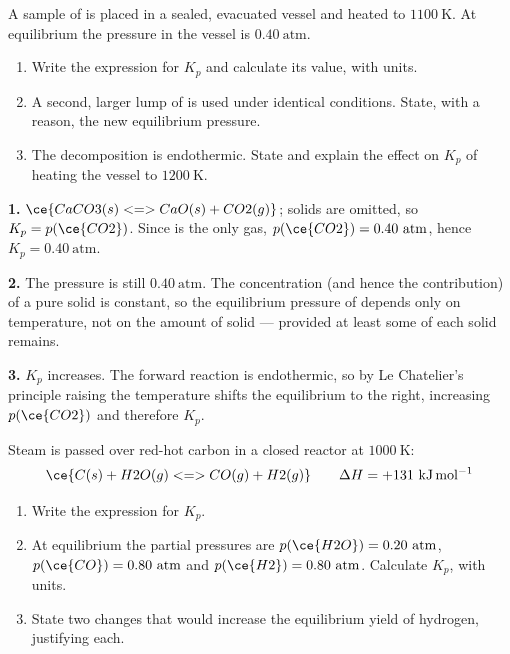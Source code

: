\documentclass[11pt]{article}
\begin{document}
\begin{exercice}
A sample of  is placed in a sealed, evacuated vessel and heated to $1100\ \mathrm{K}$. At equilibrium the pressure in the vessel is $0.40\ \mathrm{atm}$.
\begin{enumerate}
\item Write the expression for $K_p$ and calculate its value, with units.
\item A second, larger lump of  is used under identical conditions. State, with a reason, the new equilibrium pressure.
\item The decomposition is endothermic. State and explain the effect on $K_p$ of heating the vessel to $1200\ \mathrm{K}$.
\end{enumerate}
\end{exercice}

\begin{corrige}[Exercise 1]
\textbf{1.} $\ce{CaCO3(s) <=> CaO(s) + CO2(g)}$; solids are omitted, so $K_p = p(\ce{CO2})$. Since  is the only gas, $p(\ce{CO2}) = 0.40\ \mathrm{atm}$, hence $K_p = 0.40\ \mathrm{atm}$.

\textbf{2.} The pressure is still $0.40\ \mathrm{atm}$. The concentration (and hence the contribution) of a pure solid is constant, so the equilibrium pressure of  depends only on temperature, not on the amount of solid — provided at least some of each solid remains.

\textbf{3.} $K_p$ increases. The forward reaction is endothermic, so by Le Chatelier's principle raising the temperature shifts the equilibrium to the right, increasing $p(\ce{CO2})$ and therefore $K_p$.
\end{corrige}

\begin{exercice}
Steam is passed over red-hot carbon in a closed reactor at $1000\ \mathrm{K}$:
\[
\ce{C(s) + H2O(g) <=> CO(g) + H2(g)} \qquad \Delta H = +131\ \mathrm{kJ\,mol^{-1}}
\]
\begin{enumerate}
\item Write the expression for $K_p$.
\item At equilibrium the partial pressures are $p(\ce{H2O}) = 0.20\ \mathrm{atm}$, $p(\ce{CO}) = 0.80\ \mathrm{atm}$ and $p(\ce{H2}) = 0.80\ \mathrm{atm}$. Calculate $K_p$, with units.
\item State two changes that would increase the equilibrium yield of hydrogen, justifying each.
\end{enumerate}
\end{exercice}
\end{document}
